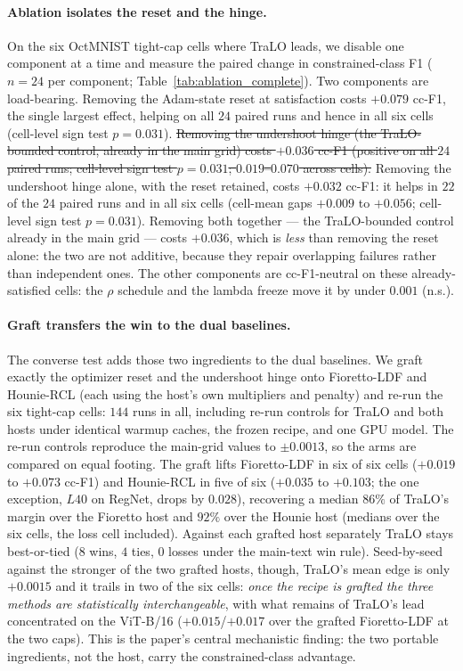 \documentclass[10pt]{article}
\newcommand{\del}[1]{{\color{red}\sout{#1}}}
\begin{document}
\paragraph{Ablation isolates the reset and the hinge.}
On the six OctMNIST tight-cap cells where TraLO leads, we disable one
component at a time and measure the paired change in constrained-class F1
($n{=}24$ per component; Table~\ref{tab:ablation_complete}). Two
components are load-bearing. Removing the Adam-state reset at satisfaction
costs $+0.079$ cc-F1, the single largest effect, helping on all $24$
paired runs and hence in all six cells (cell-level sign test $p\!=\!0.031$).
\del{Removing the undershoot hinge (the TraLO-bounded control, already in the
main grid) costs \mbox{$+0.036$} cc-F1 (positive on all \mbox{$24$} paired runs;
cell-level sign test \mbox{$p\!=\!0.031$}; \mbox{$0.019$--$0.070$} across cells).}
{\color{blue}Removing the undershoot hinge alone, with the reset retained, costs
$+0.032$ cc-F1: it helps in $22$ of the $24$ paired runs and in all six cells
(cell-mean gaps $+0.009$ to $+0.056$; cell-level sign test $p\!=\!0.031$). Removing
both together --- the TraLO-bounded control already in the main grid --- costs
$+0.036$, which is \emph{less} than removing the reset alone: the two are not
additive, because they repair overlapping failures rather than independent ones.}
The other components are cc-F1-neutral on these already-satisfied cells: the
$\rho$ schedule and the lambda freeze move it by under $0.001$ (n.s.).

\paragraph{Graft transfers the win to the dual baselines.}
The converse test adds those two ingredients to the dual baselines. We
graft exactly the optimizer reset and the undershoot hinge onto
Fioretto-LDF and Hounie-RCL (each using the host's own multipliers and
penalty) and re-run the six tight-cap cells: $144$ runs in all, including
re-run controls for TraLO and both hosts under identical warmup caches,
the frozen recipe, and one GPU model. The re-run controls reproduce the
main-grid values to $\pm0.0013$, so the arms are compared on equal
footing. The graft lifts Fioretto-LDF in six of six cells ($+0.019$ to
$+0.073$ cc-F1) and Hounie-RCL in five of six ($+0.035$ to $+0.103$; the
one exception, $L40$ on RegNet, drops by $0.028$), recovering a median
$86\%$ of TraLO's margin over the Fioretto host and $92\%$ over the
Hounie host (medians over the six cells, the loss cell included). Against
each grafted host separately TraLO stays best-or-tied ($8$ wins, $4$
ties, $0$ losses under the main-text win rule). Seed-by-seed against the
stronger of the two grafted hosts, though, TraLO's mean edge is only
$+0.0015$ and it trails in two of the six cells: \emph{once the recipe is
grafted the three methods are statistically interchangeable}, with what
remains of TraLO's lead concentrated on the ViT-B/16 ($+0.015$/$+0.017$
over the grafted Fioretto-LDF at the two caps). This is the paper's
central mechanistic finding: the two portable ingredients, not the host,
carry the constrained-class advantage.
\end{document}

